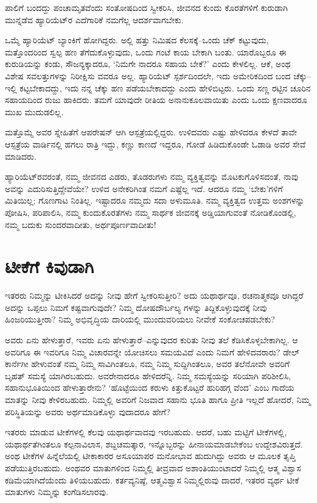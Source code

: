 ಪಾಲಿಗೆ ಬಂದದ್ದು ಪಂಚಾಮೃತವೆಂದು ಸಂತೋಷದಿಂದ ಸ್ವೀಕರಿಸಿ, ಜೀವನದ ಕುಂದು ಕೊರತೆಗಳಿಗೆ ಕುರುಡಾಗಿ ಮುನ್ನಡೆವ ಹ್ಯಾರಿಯೆಟ್​ರ ಎದೆಗಾರಿಕೆ ನಮಗೆಲ್ಲ ಆದರ್ಶವಾಗಬೇಕು.

ಒಮ್ಮೆ ಹ್ಯಾರಿಯೆಟ್ ಬ್ಯಾಂಕಿಗೆ ಹೋಗಿದ್ದರು. ಅಲ್ಲಿ ಹತ್ತು ನಿಮಿಷದ ಕೆಲಸಕ್ಕೆ–ಒಂದು ಚೆಕ್ ಕಟ್ಟುವುದು, ಮತ್ತೊಂದರಿಂದ ಸ್ವಲ್ಪ ಹಣ ತೆಗೆದುಕೊಳ್ಳುವುದು, ಒಂದು ಗಂಟೆ ಕಾಯ ಬೇಕಾಗಿ ಬಂತು. ಯಾರೊಬ್ಬರೂ ಈ ಕುರುಡಿಯನ್ನು ಕಂಡು, ಸೌಜನ್ಯಕ್ಕಾದರೂ, ‘ನಿಮಗೇ ನಾದರೂ ಸಹಾಯ ಬೇಕೆ?’ ಎಂದು ಕೇಳಲಿಲ್ಲ. ಆಕೆ, ಅಂಥ ವಿಶೇಷ ಸವಲತ್ತುಗಳನ್ನು ನಿರೀಕ್ಷಿಸು ವವರೂ ಅಲ್ಲ. ಹ್ಯಾರಿಯೆಟ್ ಸ್ಪರ್ಶದಿಂದಲೇ, ಇದು ಅಮೇರಿಕದಿಂದ ಬಂದ ಚೆಕ್ಕು–ಇಲ್ಲಿ ಕಟ್ಟಬೇಕಾದದ್ದು, ಇದು ನನ್ನ ಚೆಕ್ಕು ಹಣ ಪಡೆಯಬೇಕಾದದ್ದು ಎಂದು ಹೇಳಿಬಿಟ್ಟರು. ಒಂದು ಸಣ್ಣ ರಟ್ಟಿನ ಚೂರಿನ ಸಹಾಯದಿಂದ ರುಜು ಹಾಕಿದರು. ತಮಗೆ ಯಾವುದೇ ರೀತಿಯ ಅನಾನುಕೂಲವಾಯಿತು ಎಂದು ಒಂದು ಕ್ಷಣವಾದರೂ ಮುಖ ಮುದುಡಲಿಲ್ಲ.

ಮತ್ತೊಮ್ಮೆ ಅವರ ಸ್ನೇಹಿತೆಗೆ ಆಪರೇಷನ್ ಆಗಿ ಆಸ್ಪತ್ರೆಯಲ್ಲಿದ್ದರು. ಉಳಿದವರು ಎಷ್ಟು ಹೇಳಿದರೂ ಕೇಳದೆ ತಾವೇ ಆಸ್ಪತ್ರೆಯ ವಾರ್ಡಿನಲ್ಲಿ ಹಗಲು ರಾತ್ರಿ ಇದ್ದು, ಕಣ್ಣು ಕಾಣದೆ ಇದ್ದರೂ, ಗೋಡೆ ಹಿಡಿದುಕೊಂಡೇ ಓಡಾಡಿ ಅವರ ಸೇವೆ ಮಾಡಿದರು.

ಹ್ಯಾರಿಯೆಟ್​ರವರಂತೆ, ನಮ್ಮ ಜೀವನದ ಎಡರು, ತೊಡರುಗಳು ನಮ್ಮ ವ್ಯಕ್ತಿತ್ವವನ್ನು ಮೊಟಕುಗೊಳಿಸದಂತೆ, ನಾವು ಅವನ್ನು ಎದುರಿಸುತ್ತಿದ್ದೇವೆಯೇ? ಉಳಿದ ಅನೇಕರಿಗಿಂತ ನಮಗೆ ಎಷ್ಟೆಲ್ಲ ಇದೆ. ಆದರೂ ನಮ್ಮ ‘ಬೇಕು’ಗಳಿಗೆ ಮಿತಿಯಿಲ್ಲ; ಗೊಣಗಾಟ ನಿಂತಿಲ್ಲ. ಇಷ್ಟಾದರೂ ನಮ್ಮದು ಸದಾ ಅಳುಮೂತಿ. ನಮ್ಮ ವ್ಯಕ್ತಿತ್ವದ ಉತ್ತಮ ಅಂಶಗಳನ್ನು ಪೋಷಿಸಿ, ಪರಿಪಾಲಿಸಿ, ನಮ್ಮ ಕುಂದುಕೊರತೆಗಳು ನಮ್ಮ ಸಾರ್ಥಕ ಜೀವನಕ್ಕೆ ಅಡ್ಡಿಯಾಗುವಂತೆ ನೋಡಿಕೊಂಡಲ್ಲಿ, ನಮ್ಮ ಬದುಕು ಸುಂದರವಾದೀತು, ಅರ್ಥಪೂರ್ಣವಾದೀತು!


\section{ಟೀಕೆಗೆ ಕಿವುಡಾಗಿ}

ಇತರರು ನಿಮ್ಮನ್ನು ಟೀಕಿಸಿದರೆ ಅದನ್ನು ನೀವು ಹೇಗೆ ಸ್ವೀಕರಿಸುತ್ತೀರಿ? ಅದು ಯಥಾರ್ಥವೂ, ರಚನಾತ್ಮಕವೂ ಆಗಿದ್ದರೆ ಅದನ್ನು ಒಪ್ಪಲು ನಿಮಗೆ ಕಷ್ಟವಾಗುವುದೇ? ನಿಮ್ಮ ದೋಷದೌರ್ಬಲ್ಯ ಗಳನ್ನು ತಿದ್ದಿಕೊಳ್ಳುವುದಕ್ಕೆ ನೀವು ಹಿಂಜರಿಯುತ್ತೀರಾ? ನಿಮ್ಮ ಅಭಿವೃದ್ಧಿಯ ದಾರಿಯಲ್ಲಿ ಮುಂದುವರಿಯಲು ನೀವೇಕೆ ಸಂಕೋಚಪಡಬೇಕು?

ಅವರು ಏನು ಹೇಳುತ್ತಾರೆ, ಇವರು ಏನು ಹೇಳುತ್ತಾರೆ–ಎನ್ನುವುದರ ಕುರಿತು ನೀವು ತಲೆ ಕೆಡಿಸಿಕೊಳ್ಳಬೇಕಾಗಿಲ್ಲ. ಆ ಅವರಿಗೂ ಈ ಇವರಿಗೂ ನಿಮ್ಮ ವಿಚಾರವನ್ನೇ ಯೋಚಿಸಲು ಸಮಯವಿದೆ ಎಂದು ನಿಮಗೆ ಹೇಳಿದವರಾರು? ಡೇಲ್ ಕಾರ್ನೆಗೀ ಹೇಳುವಂತೆ ನಮ್ಮ ನಿಮ್ಮ ಸಾವಿಗಿಂತಲೂ, ನಮ್ಮ ನಿಮ್ಮ ಸುದ್ದಿಗಿಂತಲೂ, ಅವರ ತಲೆನೋವೇ ಅವರಿಗೆ ಬೃಹತ್ ಸಮಸ್ಯೆ ಯಾಗಿರಬಹುದು. ಅವರೇನಾದರೂ ಹೇಳಿದರೆನ್ನಿ. ನಿಮ್ಮ ಸಮಸ್ಯೆಯನ್ನು ಸರಿಯಾಗಿ ಪರಿಶೀಲಿಸಿ, ಸಹಾನುಭೂತಿಯಿಂದ ಹೇಳುತ್ತಾರೇನು? ‘ಹೊಟ್ಟೆಯಿಂದ ಕರುಳು ಕಿತ್ತುಕೊಟ್ಟರೆ ಹುರಿಹಗ್ಗ ವೆಂದ’ ಎಂಬ ಗಾದೆಯ ಮಾತನ್ನು ನೀವು ಕೇಳಿರಬಹುದು. ನಿಮ್ಮಲ್ಲಿ ಅವರಿಗೆ ನಿಜವಾದ ಸಹಾನು ಭೂತಿ ಹಾಗೂ ಪ್ರೀತಿ ಇಲ್ಲದೆ ಹೋದರೆ, ನಿಮ್ಮ ಪರಿಸ್ಥಿತಿಯನ್ನು ಅವರು ಅರ್ಥಮಾಡಿಕೊಳ್ಳು ವುದಾದರೂ ಹೇಗೆ?

ಇತರರು ಮಾಡುವ ಟೀಕೆಗಳಲ್ಲಿ ಕೆಲವು ಯಥಾರ್ಥವಾದವು ಇರಬಹುದು. ಆದರೆ, ಬಹು ಮಟ್ಟಿಗೆ ಟೀಕೆಗಳಲ್ಲಿ, ಯಥಾರ್ಥತೆಗಿಂತಲೂ ಕಲ್ಪನಾವಿಲಾಸ, ಶಬ್ದಚಮತ್ಕಾರ, ಇನ್ನೊಬ್ಬರನ್ನು ಹೀನಾಯಮಾಡಬೇಕೆಂಬ ಉದ್ದೇಶವಿರುತ್ತದೆ. ಅಂಥ ಟೀಕೆಗಳ ಹಿನ್ನೆಲೆಯಲ್ಲಿ ಟೀಕಾಕಾರರ ಅಸೂಯಾಪರ ಮನೋಭಾವ ಹುದುಗಿದ್ದು ಅವರು ಆ ಮೂಲಕ ತೃಪ್ತಿ ಪಡೆಯುತ್ತಿರಬಹುದು. ಅಂಥವರ ಮಾತುಗಳಿಂದ ನಿಮ್ಮಲ್ಲಿ ತೀವ್ರವಾದ ಅಶಾಂತಿಯುಂಟಾದರೆ ನಿಮ್ಮಲ್ಲಿ ಆತ್ಮ ವಿಶ್ವಾಸ ಕಡಿಮೆಯಾಗಿದೆಯೆಂದು ತಿಳಿಯಬಹುದು. ಕರ್ತವ್ಯನಿಷ್ಠೆ, ಆತ್ಮವಿಶ್ವಾಸ ನಿಮ್ಮಲ್ಲಿರುವು ದಾದರೆ, ಇತರರ ವ್ಯರ್ಥ ಟೀಕೆ ಮಾತುಗಳು ನಿಮ್ಮನ್ನು ಕಂಗೆಡಿಸಲಾರವು.

